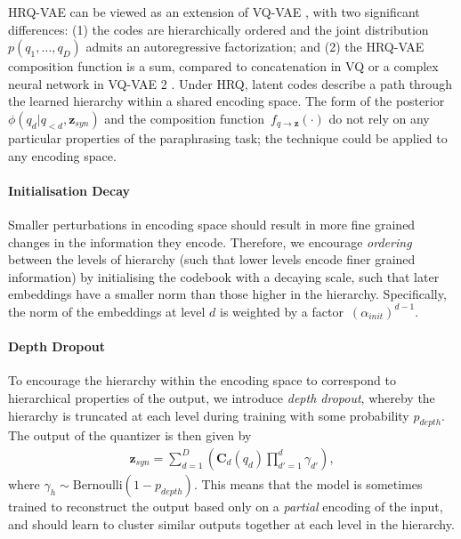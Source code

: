 \documentclass[11pt]{article}
\begin{document}
HRQ-VAE can be viewed as an extension of VQ-VAE \cite{vqvae}, with two
significant differences: (1) the codes are hierarchically ordered and
the joint distribution $p(q_1, \ldots, q_D)$ admits an autoregressive
factorization; and (2) the HRQ-VAE composition function is a sum,
compared to concatenation in VQ or a complex neural network in VQ-VAE 2 \cite{vqvae2}. Under HRQ, latent codes describe
a path through the learned hierarchy within a shared encoding space. The form of the posterior~$\phi(q_d
| q_{< d}, \textbf{z}_{syn} )$ and the composition function~$f_{q
  \rightarrow \textbf{z}}(\cdot)$ do not rely on any particular
properties of the paraphrasing task; the technique could be applied to
any encoding space.











\paragraph{Initialisation Decay} Smaller perturbations in encoding space should result in more fine grained changes in the information they encode. Therefore, we encourage \textit{ordering} between the levels of hierarchy (such that lower levels encode finer grained information) by initialising the codebook with a decaying scale, such that later embeddings have a smaller norm than those higher in the hierarchy. Specifically, the norm of the embeddings at level $d$ is weighted by a factor~$(\alpha_{init}) ^ {d-1}$.



\paragraph{Depth Dropout} To encourage the hierarchy within the encoding space to correspond to hierarchical properties of the output, we introduce \textit{depth dropout}, whereby the hierarchy is truncated at each level during training with some probability $p_{depth}$. The output of the quantizer is then given by 
\begin{align}
\textbf{z}_{syn} = \sum \limits_{d=1}^D \left ( \textbf{C}_d(q_d) \prod\limits_{d'=1}^d \gamma_{d'} \right ) ,
\end{align}
where $\gamma_h \sim \text{Bernoulli}(1 - p_{depth})$. This means that the model is sometimes trained to reconstruct the output based only on a \textit{partial} encoding of the input, and should learn to cluster similar outputs together at each level in the hierarchy.
\end{document}
